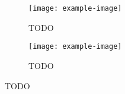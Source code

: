 \begin{figure}
\centering
\begin{subfigure}{0.45\textwidth}
    \texttt{[image: example-image]}
    \caption{TODO}
    \label{fig:todoA}
\end{subfigure}
\hfill
\begin{subfigure}{0.45\textwidth}
    \texttt{[image: example-image]}
    \caption{TODO}
    \label{fig:todoB}
\end{subfigure}
        
\caption{TODO}
\label{fig:todo}
\end{figure}


